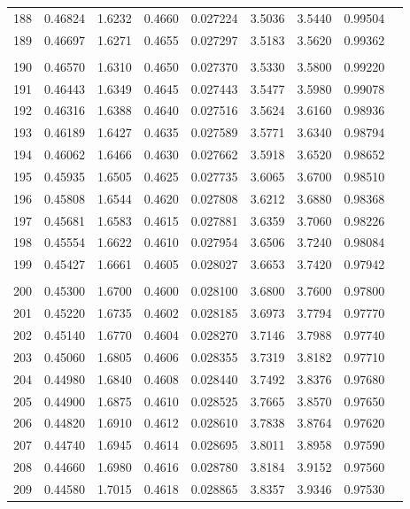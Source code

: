 \documentclass[letter,twosides,10pt]{article}
\begin{document}
\begin{longtable}{|c|c|c|c|c|c|c|c|c|}
188 & 0.46824 & 1.6232 & 0.4660 & 0.027224 & 3.5036 &  3.5440 & 0.99504 \\
189 & 0.46697 & 1.6271 & 0.4655 & 0.027297 & 3.5183 &  3.5620 & 0.99362 \\
 & & & & & & & \\
190 & 0.46570 & 1.6310 & 0.4650 & 0.027370 & 3.5330 &  3.5800 & 0.99220 \\
191 & 0.46443 & 1.6349 & 0.4645 & 0.027443 & 3.5477 &  3.5980 & 0.99078 \\
192 & 0.46316 & 1.6388 & 0.4640 & 0.027516 & 3.5624 &  3.6160 & 0.98936 \\
193 & 0.46189 & 1.6427 & 0.4635 & 0.027589 & 3.5771 &  3.6340 & 0.98794 \\
194 & 0.46062 & 1.6466 & 0.4630 & 0.027662 & 3.5918 &  3.6520 & 0.98652 \\
195 & 0.45935 & 1.6505 & 0.4625 & 0.027735 & 3.6065 &  3.6700 & 0.98510 \\
196 & 0.45808 & 1.6544 & 0.4620 & 0.027808 & 3.6212 &  3.6880 & 0.98368 \\
197 & 0.45681 & 1.6583 & 0.4615 & 0.027881 & 3.6359 &  3.7060 & 0.98226 \\
198 & 0.45554 & 1.6622 & 0.4610 & 0.027954 & 3.6506 &  3.7240 & 0.98084 \\
199 & 0.45427 & 1.6661 & 0.4605 & 0.028027 & 3.6653 &  3.7420 & 0.97942 \\
 & & & & & & & \\
200 & 0.45300 & 1.6700 & 0.4600 & 0.028100 & 3.6800 &  3.7600 & 0.97800 \\
201 & 0.45220 & 1.6735 & 0.4602 & 0.028185 & 3.6973 &  3.7794 & 0.97770 \\
202 & 0.45140 & 1.6770 & 0.4604 & 0.028270 & 3.7146 &  3.7988 & 0.97740 \\
203 & 0.45060 & 1.6805 & 0.4606 & 0.028355 & 3.7319 &  3.8182 & 0.97710 \\
204 & 0.44980 & 1.6840 & 0.4608 & 0.028440 & 3.7492 &  3.8376 & 0.97680 \\
205 & 0.44900 & 1.6875 & 0.4610 & 0.028525 & 3.7665 &  3.8570 & 0.97650 \\
206 & 0.44820 & 1.6910 & 0.4612 & 0.028610 & 3.7838 &  3.8764 & 0.97620 \\
207 & 0.44740 & 1.6945 & 0.4614 & 0.028695 & 3.8011 &  3.8958 & 0.97590 \\
208 & 0.44660 & 1.6980 & 0.4616 & 0.028780 & 3.8184 &  3.9152 & 0.97560 \\
209 & 0.44580 & 1.7015 & 0.4618 & 0.028865 & 3.8357 &  3.9346 & 0.97530 \\

\end{longtable}
\end{document}

